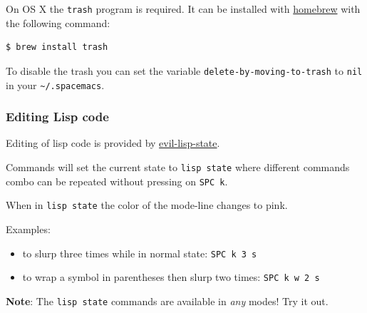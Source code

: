\documentclass[11pt]{article}
\begin{document}
On OS X the \texttt{trash} program is required. It can be installed with \href{http:www.brew.sh}{homebrew} with
the following command:

\begin{verbatim}
$ brew install trash
\end{verbatim}

To disable the trash you can set the variable \texttt{delete-by-moving-to-trash} to
\texttt{nil} in your \texttt{\textasciitilde{}/.spacemacs}.

\subsubsection{Editing Lisp code}
\label{sec:org3895a0c}
Editing of lisp code is provided by \href{https://github.com/syl20bnr/evil-lisp-state}{evil-lisp-state}.

Commands will set the current state to \texttt{lisp state} where different commands
combo can be repeated without pressing on \texttt{SPC k}.

When in \texttt{lisp state} the color of the mode-line changes to pink.

Examples:
\begin{itemize}
\item to slurp three times while in normal state: \texttt{SPC k 3 s}
\item to wrap a symbol in parentheses then slurp two times: \texttt{SPC k w 2 s}
\end{itemize}

\textbf{Note}: The \texttt{lisp state} commands are available in \emph{any} modes! Try it out.
\end{document}
